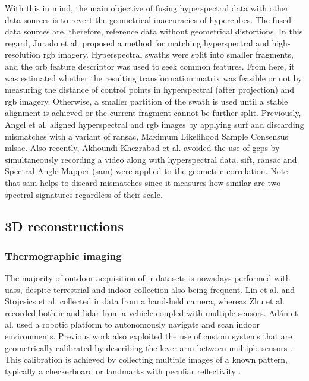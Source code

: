 With this in mind, the main objective of fusing hyperspectral data with other data sources is to revert the geometrical inaccuracies of hypercubes. The fused data sources are, therefore, reference data without geometrical distortions. In this regard, Jurado et al. \cite{jurado_efficient_2021} proposed a method for matching hyperspectral and high-resolution \acrshort{rgb} imagery. Hyperspectral swaths were split into smaller fragments, and the \acrshort{orb} feature descriptor was used to seek common features. From here, it was estimated whether the resulting transformation matrix was feasible or not by measuring the distance of control points in hyperspectral (after projection) and \acrshort{rgb} imagery. Otherwise, a smaller partition of the swath is used until a stable alignment is achieved or the current fragment cannot be further split. Previously, Angel et al. \cite{angel_automated_2020} aligned hyperspectral and \acrshort{rgb} images by applying \acrshort{surf} and discarding mismatches with a variant of \acrshort{ransac}, Maximum Likelihood Sample Consensus \acrshort{mlsac}. Also recently, Akhoundi Khezrabad et al. \cite{akhoundi_khezrabad_new_2022} avoided the use of \acrshort{gcp}s by simultaneously recording a video along with hyperspectral data. \acrshort{sift}, \acrshort{ransac} and Spectral Angle Mapper (\acrshort{sam}) were applied to the geometric correlation. Note that \acrshort{sam} helps to discard mismatches since it measures how similar are two spectral signatures regardless of their scale.

\subsection{3D reconstructions}

\subsubsection{Thermographic imaging}

The majority of outdoor acquisition of \acrshort{ir} datasets is nowadays performed with \acrshort{uas}s, despite terrestrial and indoor collection also being frequent. Lin et al. \cite{lin_fusion_2019} and Stojcsics et al. \cite{stojcsics_high_2018} collected \acrshort{ir} data from a hand-held camera, whereas Zhu et al. \cite{zhu_fusion_2021} recorded both \acrshort{ir} and \acrshort{lidar} from a vehicle coupled with multiple sensors. Adán et al. \cite{adan_towards_2020} used a robotic platform to autonomously navigate and scan indoor environments. Previous work also exploited the use of custom systems that are geometrically calibrated by describing the lever-arm between multiple sensors \cite{javadnejad_photogrammetric_2020, hoegner_fusion_2018}. This calibration is achieved by collecting multiple images of a known pattern, typically a checkerboard \cite{javadnejad_photogrammetric_2020} or landmarks with peculiar reflectivity \cite{adan_fusion_2017}. 

